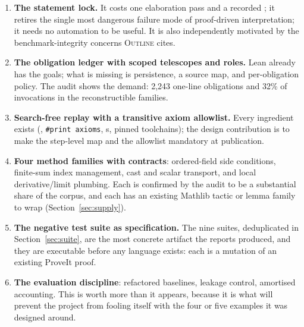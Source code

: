 \documentclass[11pt,a4paper]{article}
\newcommand{\code}[1]{\texttt{\detokenize{#1}}}
\newcommand{\Ou}{\textsc{Outline}}
\theoremstyle{definition}
\begin{document}
\begin{enumerate}
\item \textbf{The statement lock.} It costs one elaboration pass and a recorded \code{Expr}; it retires the single most dangerous failure mode of proof-driven interpretation; it needs no automation to be useful. It is also independently motivated by the benchmark-integrity concerns \Ou{} cites.
\item \textbf{The obligation ledger with scoped telescopes and roles.} Lean already has the goals; what is missing is persistence, a source map, and per-obligation policy. The audit shows the demand: 2,243 one-line obligations and 32\% of invocations in the reconstructible families.
\item \textbf{Search-free replay with a transitive axiom allowlist.} Every ingredient exists (\code{says}, \texttt{\#print axioms}, \code{.olean}s, pinned toolchains); the design contribution is to make the step-level map and the allowlist mandatory at publication.
\item \textbf{Four method families with contracts}: ordered-field side conditions, finite-sum index management, cast and scalar transport, and local derivative/limit plumbing. Each is confirmed by the audit to be a substantial share of the corpus, and each has an existing Mathlib tactic or lemma family to wrap (Section~\ref{sec:supply}).
\item \textbf{The negative test suite as specification.} The nine suites, deduplicated in Section~\ref{sec:suite}, are the most concrete artifact the reports produced, and they are executable before any language exists: each is a mutation of an existing ProveIt proof.
\item \textbf{The evaluation discipline}: refactored baselines, leakage control, amortised accounting. This is worth more than it appears, because it is what will prevent the project from fooling itself with the four or five examples it was designed around.
\end{enumerate}
\end{document}
